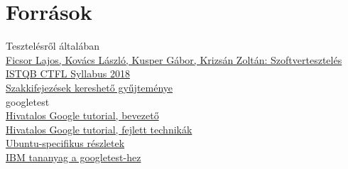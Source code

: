 \documentclass[usenames,dvipsnames,aspectratio=169]{beamer}
\newcommand{\hiv}[1]{{\color{hivatkozasszin}#1}}
\begin{document}

\section{Források}

\begin{frame}
  Tesztelésről általában\\
  \hiv{\href{https://www.tankonyvtar.hu/hu/tartalom/tamop425/0046\_szoftverteszteles/index.html}%
  {Ficsor Lajos, Kovács László, Kusper Gábor, Krizsán Zoltán: Szoftvertesztelés}}\\
  \hiv{\href{https://hstqb.org/downloadarea/istqb-ctfl-syllabus-2018-magyar/}{ISTQB CTFL Syllabus 2018}}\\
  \hiv{\href{https://glossary.istqb.org/en/search/}{Szakkifejezések kereshető gyűjteménye}}\\
  \vfill
  googletest\\
  \hiv{\href{https://github.com/google/googletest/blob/master/googletest/docs/primer.md}%
    {Hivatalos Google tutorial, bevezető}}\\
  \hiv{\href{https://github.com/google/googletest/blob/master/googletest/docs/advanced.md}%
    {Hivatalos Google tutorial, fejlett technikák}}\\
  \hiv{\href{https://www.eriksmistad.no/getting-started-with-google-test-on-ubuntu/}%
    {Ubuntu-specifikus részletek}}\\
  \hiv{\href{https://developer.ibm.com/articles/au-googletestingframework/}{IBM tananyag a googletest-hez}}\\
\end{frame}
\end{document}
